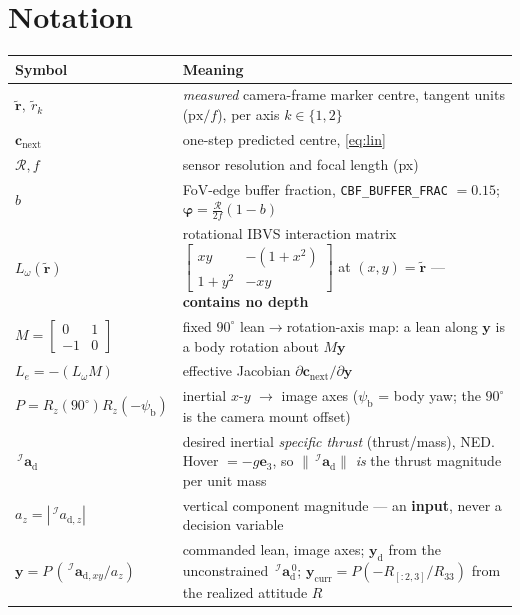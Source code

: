\documentclass[11pt]{article}
\newcommand{\Iframe}{\mathcal{I}}
\begin{document}
\section*{Notation}
\begin{tabular}{@{}l >{\raggedright\arraybackslash}p{}@{}}
\toprule
Symbol & Meaning \\
\midrule
$\tilde{\boldsymbol{r}},\ \tilde r_{k}$ & \emph{measured} camera-frame marker centre, tangent units ($\text{px}/f$), per axis $k\in\{1,2\}$ \\
$\boldsymbol{c}_\text{next}$ & one-step predicted centre, \eqref{eq:lin} \\
$\mathcal{R},f$ & sensor resolution and focal length (px) \\
$b$ & FoV-edge buffer fraction, \texttt{CBF\_BUFFER\_FRAC} $=0.15$; $\boldsymbol\varphi=\tfrac{\mathcal{R}}{2f}(1-b)$ \\
$L_\omega(\tilde{\boldsymbol{r}})$ & rotational IBVS interaction matrix $\left[\begin{smallmatrix}xy & -(1+x^2)\\ 1+y^2 & -xy\end{smallmatrix}\right]$ at $(x,y)=\tilde{\boldsymbol r}$ --- \textbf{contains no depth} \\
$M=\left[\begin{smallmatrix}0&1\\-1&0\end{smallmatrix}\right]$ & fixed $90^\circ$ lean$\to$rotation-axis map: a lean along $\boldsymbol{y}$ is a body rotation about $M\boldsymbol{y}$ \\
$L_e=-(L_\omega M)$ & effective Jacobian $\partial\boldsymbol{c}_\text{next}/\partial\boldsymbol{y}$ \\
$P=R_z(90^\circ)R_z(-\psi_\text{b})$ & inertial $x$-$y$ $\to$ image axes ($\psi_\text{b}$ = body yaw; the $90^\circ$ is the camera mount offset) \\
$\,^\Iframe\boldsymbol{a}_\text{d}$ & desired inertial \emph{specific thrust} (thrust/mass), NED. Hover $=-g\boldsymbol{e}_3$, so $\|\,^\Iframe\boldsymbol{a}_\text{d}\|$ \emph{is} the thrust magnitude per unit mass \\
$a_z=|\,^\Iframe a_{\text{d},z}|$ & vertical component magnitude --- an \textbf{input}, never a decision variable \\
$\boldsymbol{y}=P\,(\,^\Iframe\boldsymbol{a}_{\text{d},xy}/a_z)$ & commanded lean, image axes; $\boldsymbol{y}_\text{d}$ from the unconstrained $\,^\Iframe\boldsymbol{a}_\text{d}^{\,0}$; $\boldsymbol{y}_\text{curr}=P(-R_{[{:}2,3]}/R_{33})$ from the realized attitude $R$ \\

\end{tabular}
\end{document}
